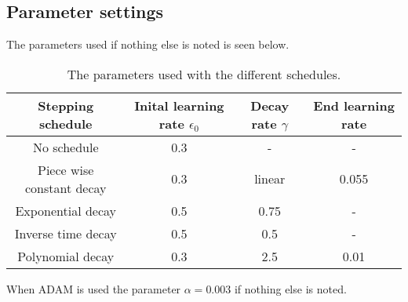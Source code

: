 \documentclass{article}
\begin{document}
\subsection{Parameter settings}

The parameters used if nothing else is noted is seen below.

\begin{table}[H]
\centering
\caption{The parameters used with the different schedules.}
\begin{tabular}{||c c c c||}
 \hline
 \textbf{Stepping schedule} & \textbf{Inital learning rate $\epsilon_0$} & \textbf{Decay rate $\gamma$} & \textbf{End learning rate} \\ [0.5ex]
 \hline\hline
 No schedule & 0.3 & - & - \\ 
 \hline
 Piece wise constant decay & 0.3 & linear & 0.055 \\
 \hline
 Exponential decay & 0.5 & 0.75 & - \\
 \hline
 Inverse time decay & 0.5 & 0.5 & - \\
 \hline
 Polynomial decay & 0.3 & 2.5 & 0.01 \\
 \hline
\end{tabular}
\label{ParameterTable}
\end{table}

\noindent When ADAM is used the parameter $\alpha = 0.003$ if nothing else is noted.




\end{document}
